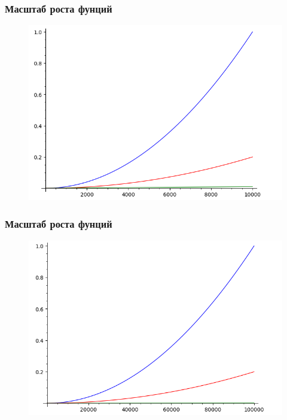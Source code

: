 \documentclass[russian, 12pt]{beamer}
\begin{document}
\begin{frame}
\frametitle{Масштаб роста фунций}
\begin{figure}
  \includegraphics[width=\linewidth]{img/complexity_5.png}
\end{figure}
\end{frame}
\begin{frame}
\frametitle{Масштаб роста фунций}
\begin{figure}
  \includegraphics[width=\linewidth]{img/complexity_6.png}
\end{figure}
\end{frame}
\end{document}
